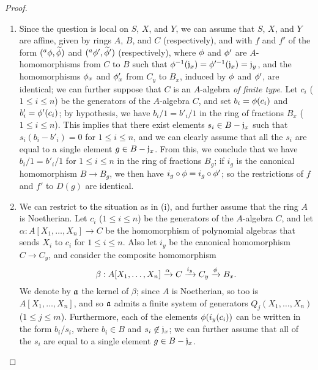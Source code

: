 \begin{proof}
\label{proof-1.6.5.1}
\medskip\noindent
\begin{enumerate}[label=(\roman*)]
    \item Since the question is local on $S$, $X$, and $Y$, we can assume that $S$, $X$, and $Y$ are affine, given by rings $A$, $B$, and $C$ (respectively), and with $f$ and $f'$ of the form $({}^a\phi,{\widetilde{\phi}})$ and $({}^a\phi',{\widetilde{\phi}}')$ (respectively), where $\phi$ and $\phi'$ are $A$-homomorphisms from $C$ to $B$ such that $\phi^{-1}(\mathfrak{j}_x)=\phi'^{-1}(\mathfrak{j}_x)=\mathfrak{j}_y$, and the homomorphisms $\phi_x$ and $\phi'_x$ from $C_y$ to $B_x$, induced by $\phi$ and $\phi'$, are identical;
        we can further suppose that $C$ is an $A$-algebra \emph{of finite type}.
        Let $c_i$ ($1\leq i\leq n$) be the generators of the $A$-algebra $C$, and set $b_i=\phi(c_i)$ and $b'_i=\phi'(c_i)$;
        by hypothesis, we have $b_i/1=b'_i/1$ in the ring of fractions $B_x$ ($1\leq i\leq n$).
        This implies that there exist elements $s_i\in B-\mathfrak{j}_x$ such that $s_i(b_i-b'_i)=0$ for $1\leq i\leq n$, and we can clearly assume that all the $s_i$ are equal to a single element $g\in B-\mathfrak{j}_x$.
        From this, we conclude that we have $b_i/1=b'_i/1$ for $1\leq i\leq n$ in the ring of fractions $B_g$;
        if $i_g$ is the canonical homomorphism $B\to B_g$, we then have $i_g\circ\phi=i_g\circ\phi'$;
        so the restrictions of $f$ and $f'$ to $D(g)$ are identical.
    \item We can restrict to the situation as in (i), and further assume that the ring $A$ is Noetherian.
        Let $c_i$ ($1\leq i\leq n$) be the generators of the $A$-algebra $C$, and let $\alpha:A[X_1,\ldots,X_n]\to C$ be the homomorphism of polynomial algebras that sends $X_i$ to $c_i$ for $1\leq i\leq n$.
        Also let $i_y$ be the canonical homomorphism $C\to C_y$, and consider the composite homomorphism
        \[
            \beta:A[X_1,\ldots,X_n] \xrightarrow{\alpha} C \xrightarrow{i_y} C_y \xrightarrow{\phi} B_x.
        \]
        We denote by $\mathfrak{a}$ the kernel of $\beta$;
        since $A$ is Noetherian, so too is $A[X_1,\ldots,X_n]$, and so $\mathfrak{a}$ admits a finite system of generators $Q_j(X_1,\ldots,X_n)$ ($1\leq j\leq m$).
        Furthermore, each of the elements $\phi(i_y(c_i))$ can be written in the form $b_i/s_i$, where $b_i\in B$ and $s_i\not\in\mathfrak{j}_x$;
        we can further assume that all of the $s_i$ are equal to a single element $g\in B-\mathfrak{j}_x$.

\end{enumerate}
\end{proof}
